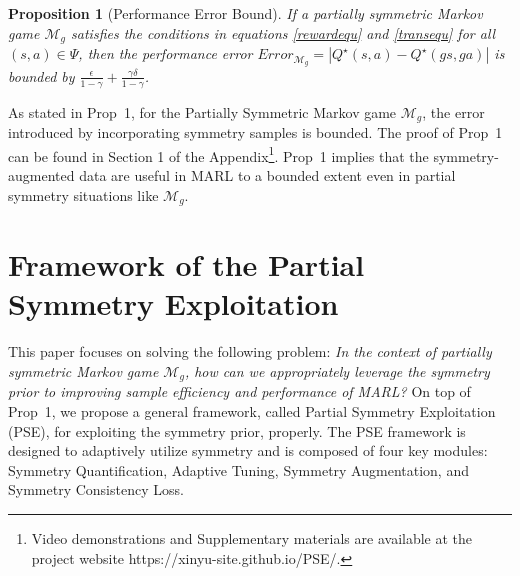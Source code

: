\documentclass[letterpaper]{article} %
\theoremstyle{definition}
\newtheorem{proposition}{Proposition}
\begin{document}
\begin{proposition}[Performance Error Bound]
\label{prop1}
\textit{If a partially symmetric Markov game $\mathcal{M}_g$  satisfies the conditions in equations \eqref{rewardequ} and \eqref{transequ} for all $(s, a) \in \Psi$, then the performance error $\textit{Error}_{\mathcal{M}_g}=|Q^{\star}(s, a) - Q^{\star}(gs, ga)|$ is bounded by $\frac{\epsilon}{1-\gamma} + \frac{\gamma \delta}{1-\gamma}$.}
\end{proposition} 
As stated in Prop~1, for the Partially Symmetric Markov game $\mathcal{M}_g$, the error introduced by incorporating symmetry samples is bounded. The proof of Prop~1 can be found in Section 1 of the Appendix\footnote{Video demonstrations and Supplementary materials are available at the project website
https://xinyu-site.github.io/PSE/.}. Prop~1 implies that the symmetry-augmented data are useful in MARL to a bounded extent even in partial symmetry situations like $\mathcal{M}_g$. 



\section{Framework of the Partial Symmetry Exploitation}


This paper focuses on solving the following problem: \textit{In the context of partially symmetric Markov game $\mathcal{M}_g$, how can we appropriately leverage the symmetry prior to improving sample efficiency and performance of MARL?} On top of Prop~1, we propose a general framework, called Partial Symmetry Exploitation (PSE), for exploiting the symmetry prior, properly. The PSE framework is designed to adaptively utilize symmetry and is composed of four key modules: Symmetry Quantification, Adaptive Tuning, Symmetry Augmentation, and Symmetry Consistency Loss.
\end{document}
